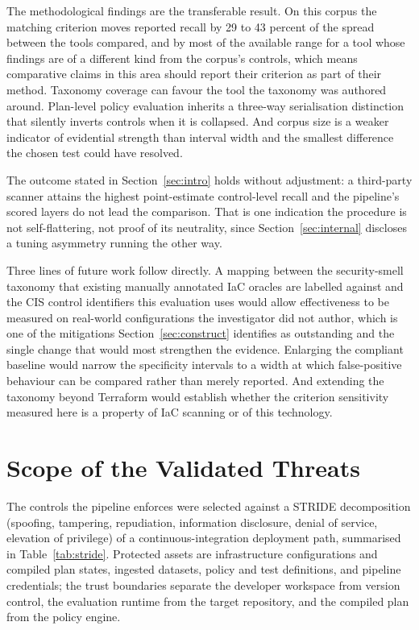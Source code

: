 \documentclass[smallextended]{svjour3}
\begin{document}
The methodological findings are the transferable result. On this corpus the
matching criterion moves reported recall by 29 to 43 percent of the spread between
the tools compared, and by most of the available range for a tool whose findings
are of a different kind from the corpus's controls, which means comparative
claims in this area should report their criterion as part of their method.
Taxonomy coverage can favour the tool the taxonomy was authored around. Plan-level
policy evaluation inherits a three-way serialisation distinction that silently
inverts controls when it is collapsed. And corpus size is a weaker indicator of
evidential strength than interval width and the smallest difference the chosen
test could have resolved.

The outcome stated in Section~\ref{sec:intro} holds without adjustment: a
third-party scanner attains the highest point-estimate control-level recall and
the pipeline's scored layers do not lead the comparison. That is one indication
the procedure is not self-flattering, not proof of its neutrality, since
Section~\ref{sec:internal} discloses a tuning asymmetry running the other way.

Three lines of future work follow directly. A mapping between the security-smell
taxonomy that existing manually annotated IaC oracles are labelled against and
the CIS control identifiers this evaluation uses would allow effectiveness to be
measured on real-world configurations the investigator did not author, which is
one of the mitigations Section~\ref{sec:construct} identifies as outstanding and the
single change that would most strengthen the evidence. Enlarging the compliant
baseline would narrow the specificity intervals to a width at which
false-positive behaviour can be compared rather than merely reported. And
extending the taxonomy beyond Terraform would establish whether the criterion
sensitivity measured here is a property of IaC scanning or of this technology.

\appendix
\section{Scope of the Validated Threats}
\label{app:threats}

The controls the pipeline enforces were selected against a STRIDE decomposition
(spoofing, tampering, repudiation, information disclosure, denial of service,
elevation of privilege) \citep{shostack2014threat} of a continuous-integration deployment path,
summarised in Table~\ref{tab:stride}. Protected assets are infrastructure
configurations and compiled plan states, ingested datasets, policy and test
definitions, and pipeline credentials; the trust boundaries separate the developer
workspace from version control, the evaluation runtime from the target
repository, and the compiled plan from the policy engine.
\end{document}
